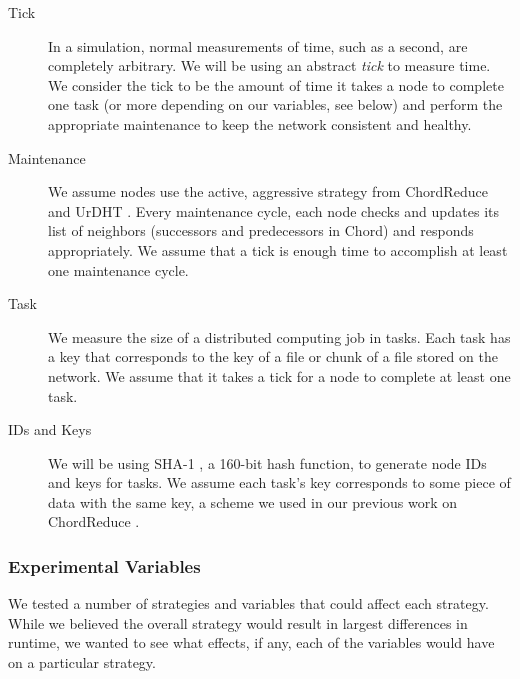 \documentclass[11pt,letterpaper]{article}
\begin{document}
\begin{description}
	\item [Tick] In a simulation, normal measurements of time, such as a second, are completely arbitrary.  
	We will be using an abstract \textit{tick} to measure time.  
	We consider the tick to be the amount of time it takes a node to complete one task (or more depending on our variables, see below) and perform the appropriate maintenance to keep the network consistent and healthy.
	\item [Maintenance] We assume nodes use the active, aggressive strategy from ChordReduce and UrDHT \cite{chordreduce} \cite{urdht}.
	Every maintenance cycle, each node checks and updates its list of neighbors (successors and predecessors in Chord) and responds appropriately. 
	We assume that a tick is enough time to accomplish at least one maintenance cycle.
	\item[Task] We measure the size of a distributed computing job in tasks.
	Each task has a key that corresponds to the key of a file or chunk of a file stored on the network.
	We assume that it takes a tick for a node to complete at least one task.
	\item [IDs and Keys] 
	We will be using SHA-1 \cite{sha1}, a 160-bit hash function, to generate node IDs and keys for tasks.  
	We assume each task's key corresponds to some piece of data with the same key, a scheme we used in  our previous work on ChordReduce \cite{chordreduce}.
\end{description}

\subsubsection{Experimental Variables}
We tested a number of strategies and variables that could affect each strategy.
While we believed the overall strategy would result in largest differences in runtime, we wanted to see what effects, if any, each of the variables would have on a particular strategy.
\end{document}
